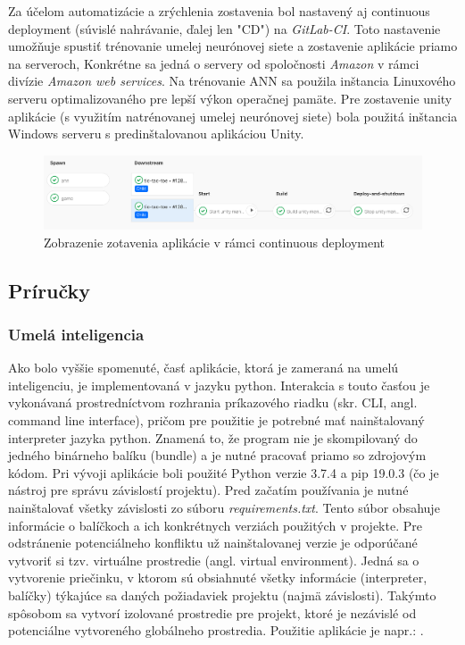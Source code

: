 Za účelom automatizácie a zrýchlenia zostavenia bol nastavený aj continuous deployment (súvislé nahrávanie, ďalej len
"CD") na \emph{GitLab-CI}.
Toto nastavenie umožňuje spustiť trénovanie umelej neurónovej siete a zostavenie aplikácie priamo na serveroch,
Konkrétne sa jedná o servery od spoločnosti \emph{Amazon} v rámci divízie \emph{Amazon web services}.
Na trénovanie ANN sa použila inštancia Linuxového serveru optimalizovaného pre lepší výkon operačnej pamäte.
Pre zostavenie unity aplikácie (s využitím natrénovanej umelej neurónovej siete) bola použitá inštancia Windows
serveru s predinštalovanou aplikáciou Unity.
\begin{figure}[H]
    \centering
    \includegraphics[width=1\textwidth]{images/impl-cd.png}
    \caption{Zobrazenie zotavenia aplikácie v rámci continuous deployment}
\end{figure}\label{figure:cd}

\subsection{Príručky}\label{subsec:helpers}
\subsubsection{Umelá inteligencia}
Ako bolo vyššie spomenuté, časť aplikácie, ktorá je zameraná na umelú inteligenciu, je implementovaná v jazyku python.
Interakcia s touto časťou je vykonávaná prostredníctvom rozhrania príkazového riadku (skr. CLI, angl. command line
interface), pričom pre použitie je potrebné mať nainštalovaný interpreter jazyka python.
Znamená to, že program nie je skompilovaný do jedného binárneho balíku (bundle) a je nutné pracovať priamo so zdrojovým
kódom.
Pri vývoji aplikácie boli použité Python verzie 3.7.4 a pip 19.0.3 (čo je nástroj pre správu závislostí projektu).
Pred začatím používania je nutné nainštalovať všetky závislosti zo súboru \emph{requirements.txt}.
Tento súbor obsahuje informácie o balíčkoch a ich konkrétnych verziách použitých v projekte.
Pre odstránenie potenciálneho konfliktu už nainštalovanej verzie je odporúčané vytvoriť si tzv. virtuálne prostredie
(angl. virtual environment).
Jedná sa o vytvorenie priečinku, v ktorom sú obsiahnuté všetky informácie (interpreter, balíčky) týkajúce sa daných
požiadaviek projektu (najmä závislosti).
Takýmto spôsobom sa vytvorí izolované prostredie pre projekt, ktoré je nezávislé od potenciálne vytvoreného globálneho
prostredia.
Použitie aplikácie je napr.: .

